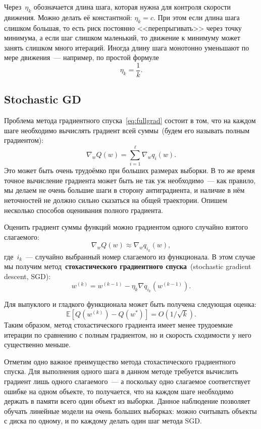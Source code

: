 \documentclass[a4paper, 12pt]{article}
\theoremstyle{plain} %
\theoremstyle{definition} %
\theoremstyle{remark} %
\begin{document}
Через~$\eta_k$ обозначается длина шага, которая нужна для контроля скорости движения.
Можно делать её константной: $\eta_k = c$.
При этом если длина шага слишком большая, то есть риск постоянно <<перепрыгивать>> через точку минимума,
а если шаг слишком маленький, то движение к минимуму может занять слишком много итераций.
Иногда длину шага монотонно уменьшают по мере движения~--- например, по простой формуле
\[
    \eta_k
    =
    \frac{1}{k}.
\]

\subsection{Stochastic GD}

Проблема метода градиентного спуска~\eqref{eq:fullgrad} состоит в том,
что на каждом шаге необходимо вычислять градиент всей суммы~(будем его называть полным градиентом):
\[
    \nabla_w Q(w)
    =
    \sum_{i = 1}^{\ell}
        \nabla_w q_i(w).
\]
Это может быть очень трудоёмко при больших размерах выборки.
В то же время точное вычисление градиента может быть не так уж необходимо~---
как правило, мы делаем не очень большие шаги в сторону антиградиента,
и наличие в нём неточностей не должно сильно сказаться на общей траектории.
Опишем несколько способов оценивания полного градиента.

Оценить градиент суммы функций можно градиентом одного случайно взятого слагаемого:
\[
    \nabla_w Q(w)
    \approx
    \nabla_w q_{i_k}(w),
\]
где~$i_k$~--- случайно выбранный номер слагаемого из функционала.
В этом случае мы получим метод~\textbf{стохастического
градиентного спуска}~(stochastic gradient descent, SGD):
\[
    w^{(k)} = w^{(k - 1)} - \eta_k \nabla q_{i_k}(w^{(k - 1)}).
\]

Для выпуклого и гладкого функционала может быть получена
следующая оценка:
\[
    \mathbb{E} \left[
        Q(w^{(k)}) - Q(w^*)
    \right]
    =
    O(1 / \sqrt{k}).
\]
Таким образом, метод стохастического градиента имеет менее
трудоемкие итерации по сравнению с полным градиентом,
но и скорость сходимости у него существенно меньше.

Отметим одно важное преимущество метода стохастического градиентного спуска.
Для выполнения одного шага в данном методе требуется вычислить градиент лишь одного слагаемого~---
а поскольку одно слагаемое соответствует ошибке на одном объекте,
то получается, что на каждом шаге необходимо держать в памяти всего один объект из выборки.
Данное наблюдение позволяет обучать линейные модели на очень больших выборках:
можно считывать объекты с диска по одному, и по каждому делать один шаг метода SGD.
\end{document}
